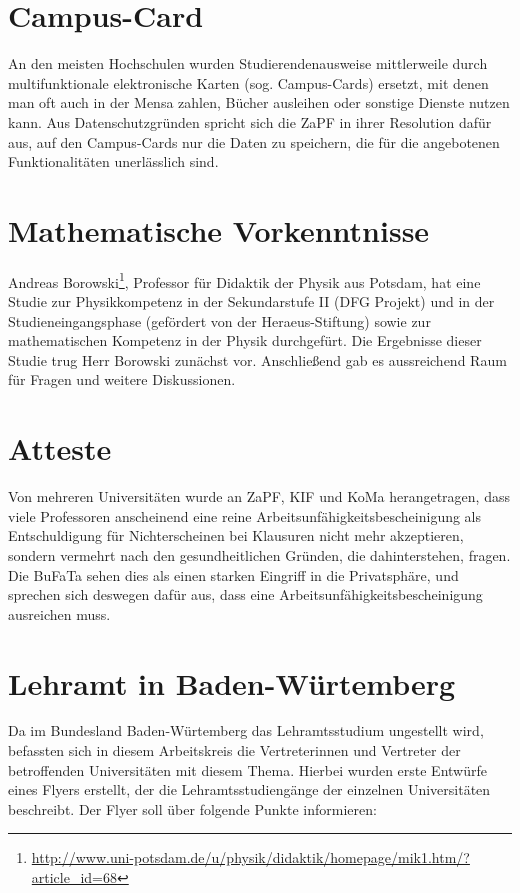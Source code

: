 \documentclass{scrartcl}
\begin{document}
\section*{Campus-Card}
An den meisten Hochschulen wurden Studierendenausweise mittlerweile durch
multifunktionale elektronische Karten (sog. Campus-Cards) ersetzt, mit denen
man oft auch in der Mensa zahlen, Bücher ausleihen oder sonstige Dienste nutzen
kann.
Aus Datenschutzgründen spricht sich die ZaPF in ihrer Resolution dafür aus, auf
den Campus-Cards nur die Daten zu speichern, die für die angebotenen
Funktionalitäten unerlässlich sind.

\section*{Mathematische Vorkenntnisse}

Andreas Borowski\footnote{\href{http://www.uni-potsdam.de/u/physik/didaktik/homepage/mik1.htm/?article_id=68}{\url{http://www.uni-potsdam.de/u/physik/didaktik/homepage/mik1.htm/?article_id=68}}},
Professor für Didaktik der Physik aus Potsdam, hat eine Studie zur Physikkompetenz
in der Sekundarstufe II (DFG Projekt) und in der Studieneingangsphase
(gefördert von der Heraeus-Stiftung) sowie zur mathematischen Kompetenz in
der Physik durchgefürt. Die Ergebnisse dieser Studie trug Herr Borowski
zunächst vor. Anschließend gab es aussreichend Raum für Fragen und weitere
Diskussionen.

\section*{Atteste}

Von mehreren Universitäten wurde an ZaPF, KIF und KoMa herangetragen, dass
viele Professoren anscheinend eine reine Arbeitsunfähigkeitsbescheinigung als
Entschuldigung für Nichterscheinen bei Klausuren nicht mehr akzeptieren,
sondern vermehrt nach den gesundheitlichen Gründen, die dahinterstehen, fragen.
Die BuFaTa sehen dies als einen starken Eingriff in die Privatsphäre, und
sprechen sich deswegen dafür aus, dass eine Arbeitsunfähigkeitsbescheinigung
ausreichen muss.

\section*{Lehramt in Baden-Würtemberg}

Da im Bundesland Baden-Würtemberg das Lehramtsstudium ungestellt wird,
befassten sich in diesem Arbeitskreis die Vertreterinnen und Vertreter der
betroffenden Universitäten mit diesem Thema. Hierbei wurden erste Entwürfe
eines Flyers erstellt, der die Lehramtsstudiengänge der einzelnen Universitäten
beschreibt. Der Flyer soll über folgende Punkte informieren:
\end{document}
